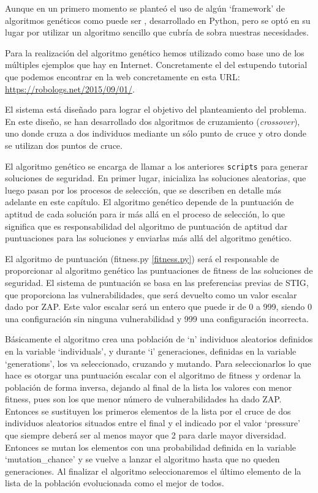 \bigskip
Aunque en un primero momento se planteó el uso de algún `framework' de algoritmos genéticos como puede ser , desarrollado en Python, pero se optó en su lugar por utilizar un algoritmo sencillo que cubría de sobra nuestras necesidades.

\bigskip
Para la realización del algoritmo genético hemos utilizado como base uno de los múltiples ejemplos que hay en Internet. Concretamente el del estupendo tutorial que podemos encontrar en la web  concretamente en esta URL: \url{https://robologs.net/2015/09/01/}.

\bigskip
El sistema está diseñado para lograr el objetivo del planteamiento del problema. En este diseño, se han desarrollado dos algoritmos de cruzamiento (\textit{crossover}), uno donde cruza a dos individuos mediante un sólo punto de cruce y otro donde se utilizan dos puntos de cruce. 

\bigskip
El algoritmo genético se encarga de llamar a los anteriores \texttt{scripts} para generar soluciones de seguridad. En primer lugar, inicializa las soluciones aleatorias, que luego pasan por los procesos de selección, que se describen en detalle más adelante en este capítulo. El algoritmo genético depende de la puntuación de aptitud de cada solución para ir más allá en el proceso de selección, lo que significa que es responsabilidad del algoritmo de puntuación de aptitud dar puntuaciones para las soluciones y enviarlas más allá del algoritmo genético.

\bigskip
El algoritmo de puntuación (fitness.py \ref{fitness.py}) será el responsable de proporcionar al algoritmo genético las puntuaciones de fitness de las soluciones de seguridad. El sistema de puntuación se basa en las preferencias previas de STIG, que proporciona las vulnerabilidades, que será devuelto como un valor escalar dado por ZAP. Este valor escalar será un entero que puede ir de 0 a 999, siendo 0 una configuración sin ninguna vulnerabilidad y 999 una configuración incorrecta.

\bigskip
Básicamente el algoritmo crea una población de `n' individuos aleatorios definidos en la variable `individuals', y durante `i' generaciones, definidas en la variable `generations', los va seleccionado, cruzando y mutando. Para seleccionarlos lo que hace es otorgar una puntuación escalar con el algoritmo de fitness y ordenar la población de forma inversa, dejando al final de la lista los valores con menor fitness, pues son los que menor número de vulnerabilidades ha dado ZAP. Entonces se sustituyen los primeros elementos de la lista por el cruce de dos individuos aleatorios situados entre el final y el indicado por el valor `pressure' que siempre deberá ser al menos mayor que 2 para darle mayor diversidad. Entonces se mutan los elementos con una probabilidad definida en la variable `mutation_chance' y se vuelve a lanzar el algoritmo hasta que no queden generaciones. Al finalizar el algoritmo seleccionaremos el último elemento de la lista de la población evolucionada como el mejor de todos.


